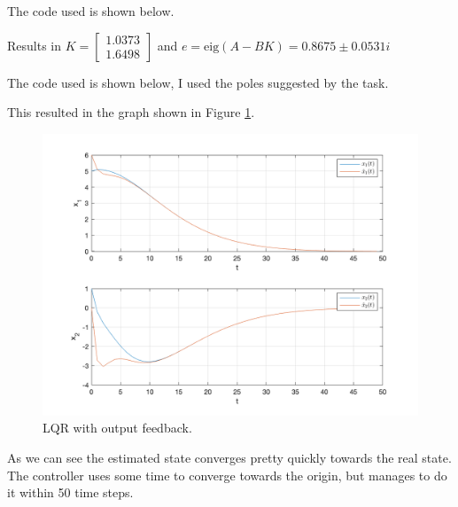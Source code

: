 \documentclass[11pt, a4paper, english]{NTNUoving}
\begin{document}
\begin{oppgave}
    \begin{punkt}
    The code used is shown below.
    
    Results in $K = \begin{bmatrix}
        1.0373 \\
        1.6498
    \end{bmatrix}$
    and $e = \text{eig}(A - BK) = 0.8675 \pm 0.0531i$
    \end{punkt}

    \begin{punkt}
        The code used is shown below, I used the poles suggested by the task.
        

        This resulted in the graph shown in Figure \ref{fig:2b}.

        \begin{figure}[H]
            \centering
            \includegraphics[width=1.0\textwidth]{../task2b.png}
            \caption{LQR with output feedback.}
            \label{fig:2b}
        \end{figure}
        As we can see the estimated state converges pretty quickly towards the real state. The controller
        uses some time to converge towards the origin, but manages to do it within 50 time steps.
    \end{punkt}


\end{oppgave}
\end{document}
